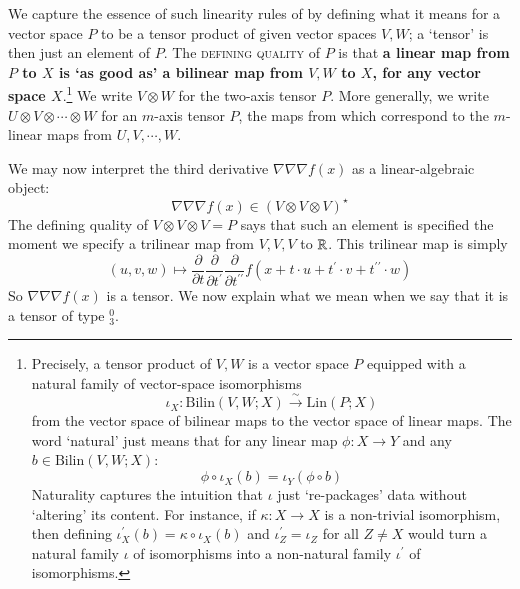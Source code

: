             We capture the essence of such linearity rules of by defining what
            it means for a vector space $P$ to be a tensor product of given
            vector spaces $V, W$; a `tensor' is then just an element of $P$.
            The \textsc{defining quality} of $P$ is that \textbf{a linear map
            from $P$ to $X$ is `as good as' a bilinear map from $V, W$ to $X$,
            for any vector space $X$}.\footnote{
                Precisely, a tensor product of $V, W$ is a vector space $P$
                equipped with a natural family of vector-space isomorphisms $$
                \iota_X: \text{Bilin}(V,W;X) \xrightarrow{\sim} \text{Lin}(P;X)
                $$ from the vector space of bilinear maps to the vector space
                of linear maps.
                The word `natural' just means that for any linear map $\phi:
                X\to Y$ and any $b \in \text{Bilin}(V,W;X)$: $$ \phi \circ
                \iota_X(b) = \iota_Y(\phi \circ b) $$ Naturality captures the
                intuition that $\iota$ just `re-packages' data without
                `altering' its content.
                For instance, if $\kappa:X\to X$ is a non-trivial isomorphism,
                then defining $\iota^\prime_X(b) = \kappa \circ \iota_X(b)$ and
                $\iota^\prime_Z = \iota_Z$ for all $Z\neq X$ would turn a
                natural family $\iota$ of isomorphisms into a non-natural
                family $\iota^\prime$ of isomorphisms.
            }
            We write $V\otimes W$ for the two-axis tensor $P$.  More
            generally, we write $U\otimes V\otimes \cdots \otimes W$ for 
            an $m$-axis tensor $P$, the maps from which correspond to
            the $m$-linear maps from $U,V,\cdots,W$.

            We may now interpret the third derivative $\nabla\nabla\nabla f(x)$
            as a linear-algebraic object:
            $$
                \nabla\nabla\nabla f(x) \in  (V\otimes V\otimes V)^\star
            $$
            The defining quality of $V\otimes V\otimes V = P$ says that such an
            element is specified the moment we specify a trilinear map from $V,
            V, V$ to $\mathbb{R}$.  This trilinear map is simply 
            $$
                (u,v,w) \mapsto 
                \frac{\partial}{\partial t}
                \frac{\partial}{\partial t^{\prime}}
                \frac{\partial}{\partial t^{\prime\prime}}
                f(x + t                \cdot u 
                    + t^{\prime}       \cdot v
                    + t^{\prime\prime} \cdot w)
            $$
            So $\nabla\nabla\nabla f(x)$ is a tensor.  We now explain what we
            mean when we say that it is a tensor of type $^0_3$. 

